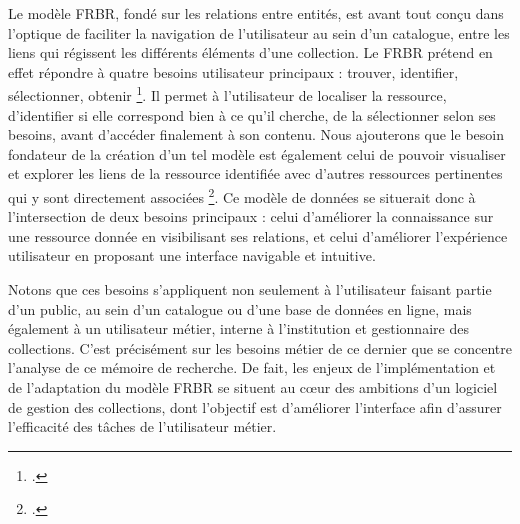 Le modèle \gls{FRBR}, fondé sur les relations entre entités, est avant tout conçu dans l’optique de faciliter la navigation de l'utilisateur au sein d'un catalogue, entre les liens qui régissent les différents éléments d'une collection.  Le \gls{FRBR} prétend en effet répondre à quatre besoins utilisateur principaux : trouver, identifier, sélectionner, obtenir \footcite{zotero-item-653}. Il permet à l'utilisateur de localiser la ressource, d'identifier si elle correspond bien à ce qu'il cherche, de la sélectionner selon ses besoins, avant d'accéder finalement à son contenu. Nous ajouterons que le besoin fondateur de la création d'un tel modèle est également celui de pouvoir visualiser et explorer les liens de la ressource identifiée avec d'autres ressources pertinentes qui y sont directement associées \footcite{zotero-item-653}. Ce modèle de données se situerait donc à l'intersection de deux besoins principaux : celui d'améliorer la connaissance sur une ressource donnée en visibilisant ses relations, et celui d'améliorer l'expérience utilisateur en proposant une interface navigable et intuitive. 

Notons que ces besoins s'appliquent non seulement à l'utilisateur faisant partie d'un public, au sein d'un catalogue ou d'une base de données en ligne, mais également à un utilisateur métier, interne à l'institution et gestionnaire des collections. C'est précisément sur les besoins métier de ce dernier que se concentre l'analyse de ce mémoire de recherche. De fait, les enjeux de l'implémentation et de l'adaptation du modèle \gls{FRBR} se situent au cœur des ambitions d'un logiciel de gestion des collections, dont l’objectif est d’améliorer l’interface afin d’assurer l’efficacité des tâches de l’utilisateur métier.  







